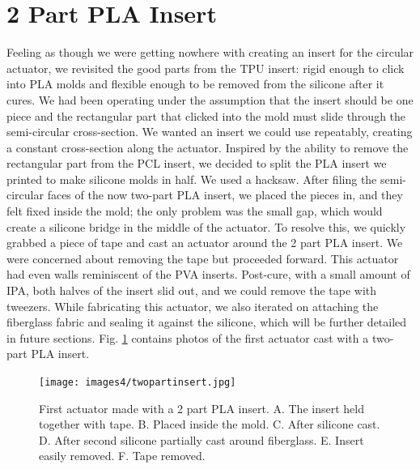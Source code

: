 \section{2 Part PLA Insert}
Feeling as though we were getting nowhere with creating an insert for the circular actuator, we revisited the good parts from the TPU insert: rigid enough to click into PLA molds and flexible enough to be removed from the silicone after it cures. We had been operating under the assumption that the insert should be one piece and the rectangular part that clicked into the mold must slide through the semi-circular cross-section. We wanted an insert we could use repeatably, creating a constant cross-section along the actuator. Inspired by the ability to remove the rectangular part from the PCL insert, we decided to split the PLA insert we printed to make silicone molds in half. We used a hacksaw. After filing the semi-circular faces of the now two-part PLA insert, we placed the pieces in, and they felt fixed inside the mold; the only problem was the small gap, which would create a silicone bridge in the middle of the actuator. To resolve this, we quickly grabbed a piece of tape and cast an actuator around the 2 part PLA insert. We were concerned about removing the tape but proceeded forward. This actuator had even walls reminiscent of the PVA inserts. Post-cure, with a small amount of IPA, both halves of the insert slid out, and we could remove the tape with tweezers. While fabricating this actuator, we also iterated on attaching the fiberglass fabric and sealing it against the silicone, which will be further detailed in future sections. Fig. \ref{fig:twopartinsert} contains photos of the first actuator cast with a two-part PLA insert. 

\begin{figure}[h]
    \centering
    \texttt{[image: images4/twopartinsert.jpg]}
    \caption{First actuator made with a 2 part PLA insert. A. The insert held together with tape. B. Placed inside the mold. C. After silicone cast. D. After second silicone partially cast around fiberglass. E. Insert easily removed. F. Tape removed.}
    \label{fig:twopartinsert}
\end{figure}

